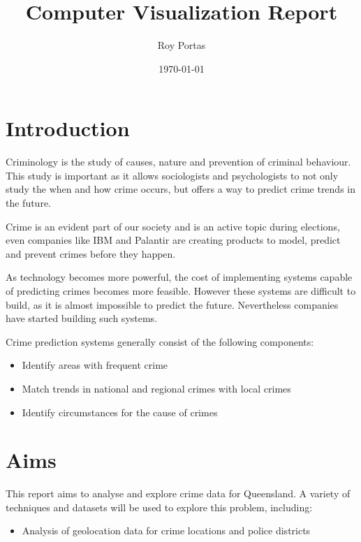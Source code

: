 \documentclass[]{article}
\begin{document}
\title{Computer Visualization Report}
\author{Roy Portas}
\date{\today}
\maketitle

\section{Introduction}

Criminology is the study of causes, nature and prevention of criminal behaviour\cite{roufa_early_nodate}.
This study is important as it allows sociologists and psychologists to not only study the when and how crime occurs, but offers a way to predict crime trends in the future.

Crime is an evident part of our society and is an active topic during elections\cite{remeikis_queensland_2016}, 
even companies like IBM\cite{noauthor_ibm_2012} and Palantir\cite{palantir_technologies_law_nodate} 
are creating products to model, predict and prevent crimes before they happen.

As technology becomes more powerful, the cost of implementing systems capable of predicting crimes becomes more feasible.
However these systems are difficult to build, as it is almost impossible to predict the future.
Nevertheless companies have started building such systems.

Crime prediction systems generally consist of the following components:
\begin{itemize}
    \item Identify areas with frequent crime\cite{noauthor_ibm_2012}
    \item Match trends in national and regional crimes with local crimes
    \item Identify circumstances for the cause of crimes\cite{noauthor_ibm_2012}
\end{itemize}

\section{Aims}

This report aims to analyse and explore crime data for Queensland. A variety of techniques and datasets will be used to explore this problem, including:

\begin{itemize}
    \item Analysis of geolocation data for crime locations and police districts
\end{itemize}
\end{document}
